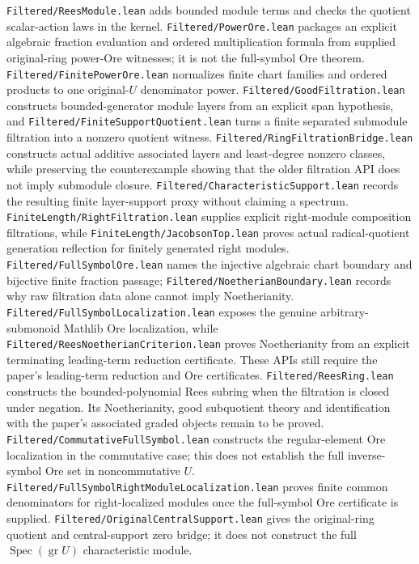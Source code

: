 \documentclass[10pt,a4paper]{article}
\newcommand{\lean}[1]{\nolinkurl{#1}}
\begin{document}
\lean{Filtered/ReesModule.lean} adds bounded module terms and checks the
quotient scalar-action laws in the kernel. \lean{Filtered/PowerOre.lean}
packages an explicit algebraic fraction evaluation and ordered multiplication
formula from supplied original-ring power-Ore witnesses; it is not the
full-symbol Ore theorem. \lean{Filtered/FinitePowerOre.lean} normalizes
finite chart families and ordered products to one original-\(U\) denominator
power. \lean{Filtered/GoodFiltration.lean} constructs bounded-generator
module layers from an explicit span hypothesis, and
\lean{Filtered/FiniteSupportQuotient.lean} turns a finite separated
submodule filtration into a nonzero quotient witness.
\lean{Filtered/RingFiltrationBridge.lean} constructs actual additive
associated layers and least-degree nonzero classes, while preserving the
counterexample showing that the older filtration API does not imply
submodule closure.
\lean{Filtered/CharacteristicSupport.lean} records the resulting finite
layer-support proxy without claiming a spectrum. \lean{FiniteLength/RightFiltration.lean}
supplies explicit right-module composition filtrations, while
\lean{FiniteLength/JacobsonTop.lean} proves actual radical-quotient
generation reflection for finitely generated right modules.
\lean{Filtered/FullSymbolOre.lean} names the injective algebraic chart
boundary and bijective finite fraction passage; \lean{Filtered/NoetherianBoundary.lean}
records why raw filtration data alone cannot imply Noetherianity.
\lean{Filtered/FullSymbolLocalization.lean} exposes the genuine
arbitrary-submonoid Mathlib Ore localization, while
\lean{Filtered/ReesNoetherianCriterion.lean} proves Noetherianity from an
explicit terminating leading-term reduction certificate. These APIs still
require the paper's leading-term reduction and Ore certificates.
\lean{Filtered/ReesRing.lean} constructs the bounded-polynomial Rees subring
when the filtration is closed under negation. Its Noetherianity, good
subquotient theory and identification with the paper's associated graded
objects remain to be proved. \lean{Filtered/CommutativeFullSymbol.lean}
constructs the regular-element Ore localization in the commutative case;
this does not establish the full inverse-symbol Ore set in noncommutative
\(U\).
\lean{Filtered/FullSymbolRightModuleLocalization.lean} proves finite common
denominators for right-localized modules once the full-symbol Ore certificate
is supplied.
\lean{Filtered/OriginalCentralSupport.lean} gives the original-ring quotient
and central-support zero bridge; it does not construct the full
\(\operatorname{Spec}(\operatorname{gr}U)\) characteristic module.
\end{document}
